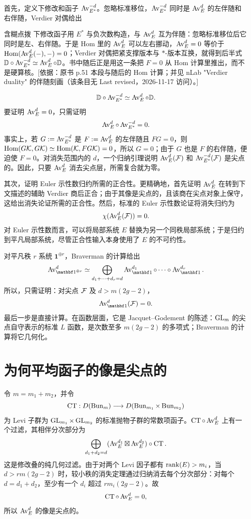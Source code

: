 首先，定义下修改和函子 $\operatorname{Av}_{E^*}^{-d}$。忽略标准移位，$\operatorname{Av}_{E^*}^{-d}$ 同时是 $\operatorname{Av}_E^d$ 的左伴随和右伴随，Verdier 对偶给出

\begin{transnote}{含糊点拨}
下修改函子用 $E^*$ 与负次数构造，与 $\operatorname{Av}_E^d$ 互为伴随：忽略标准移位后它同时是左、右伴随。于是 Hom 里的 $\operatorname{Av}_E^d$ 可以左右挪动，$\operatorname{Av}_E^d=0$ 等价于 $\operatorname{Hom}(\operatorname{Av}_E^d(-),-)=0$；Verdier 对偶把紧支撑版本与 $*$-版本互换，就得到后半式 $\mathbb D\circ\operatorname{Av}_{E^*}^{-d}\simeq\operatorname{Av}_E^d\circ\mathbb D$。书中随后正是用这一条把 $F=0$ 从 Hom 计算里推出，而不是硬算核。[依据：原书 p.51 本段与随后的 Hom 计算；并见 nLab "Verdier duality" 的伴随刻画（该条目无 Last revised，2026-11-17 访问）。]
\end{transnote}
\[\mathbb D\circ\operatorname{Av}_{E^*}^{-d}\simeq\operatorname{Av}_E^d\circ\mathbb D.\]
要证明 $\operatorname{Av}_E^d=0$，只需证明
\[\operatorname{Av}_E^d\circ\operatorname{Av}_{E^*}^{-d}=0.\]
事实上，若 $G:=\operatorname{Av}_{E^*}^{-d}$ 是 $F:=\operatorname{Av}_E^d$ 的左伴随且 $FG=0$，则 $\operatorname{Hom}(G\mathcal{K},G\mathcal{K})\simeq\operatorname{Hom}(\mathcal{K},FG\mathcal{K})=0$，所以 $G=0$；由于 $G$ 也是 $F$ 的右伴随，便迫使 $F=0$。对消失范围内的 $d$，一个归纳引理说明 $\operatorname{Av}_E^d(\mathcal{F})$ 和 $\operatorname{Av}_{E^*}^{-d}(\mathcal{F})$ 是尖点的。因此，只要 $\operatorname{Av}_E^d$ 消去尖点层，所需复合就为零。

其次，证明 Euler 示性数归约所需的正合性。更精确地，首先证明 $\operatorname{Av}_E^d$ 在转到下文描述的辅助 Verdier 商后正合；由于其像是尖点的，且该商在尖点对象上保守，这给出消失论证所需的正合性。然后，标准的 Euler 示性数论证将消失归约为
\[\chi(\operatorname{Av}_E^d(\mathcal{F}))=0.\]
对 Euler 示性数而言，可以将局部系统 $E$ 替换为另一个同秩局部系统；于是归约到平凡局部系统，尽管正合性输入本身使用了 $E$ 的不可约性。

对平凡秩 $r$ 系统 $\mathbf1^{\oplus r}$，Braverman 的计算给出
\[\Av_{\mathbf1^{\oplus r}}^d\simeq\bigoplus_{d_1+\cdots+d_r=d}\Av_{\mathbf1}^{d_1}\circ\cdots\circ\Av_{\mathbf1}^{d_r}.\]
所以，只需证明：对尖点 $\mathcal{F}$ 及 $d>m(2g-2)$，
\[\Av_{\mathbf1}^d(\cF)=0.\]
最后一步是直接计算。在函数层面，它是 Jacquet–Godement 的陈述：$\operatorname{GL}_m$ 的尖点自守表示的标准 $L$ 函数，是次数至多 $m(2g-2)$ 的多项式；Braverman 的计算将它几何化。
\section{为何平均函子的像是尖点的}\label{sec:9.7}
令 $m=m_1+m_2$，并令
\[\operatorname{CT}:D(\operatorname{Bun}_m)\longrightarrow D(\operatorname{Bun}_{m_1}\times\operatorname{Bun}_{m_2})\]
为 Levi 子群为 $\operatorname{GL}_{m_1}\times\operatorname{GL}_{m_2}$ 的标准抛物子群的常数项函子。$\operatorname{CT}\circ\operatorname{Av}_E^d$ 上有一个过滤，其相伴分次部分为
\[\bigoplus_{d_1+d_2=d}(\operatorname{Av}_E^{d_1}\boxtimes\operatorname{Av}_E^{d_2})\circ\operatorname{CT}.\]
这是修改叠的纯几何过滤。由于对两个 Levi 因子都有 $\operatorname{rank}(E)>m_i$，当 $d>rm(2g-2)$ 时，较小秩的消失定理通过归纳消去每个分次部分：对每个 $d=d_1+d_2$，至少有一个 $d_i$ 超过 $rm_i(2g-2)$。故
\[\operatorname{CT}\circ\operatorname{Av}_E^d=0,\]
所以 $\operatorname{Av}_E^d$ 的像是尖点的。

